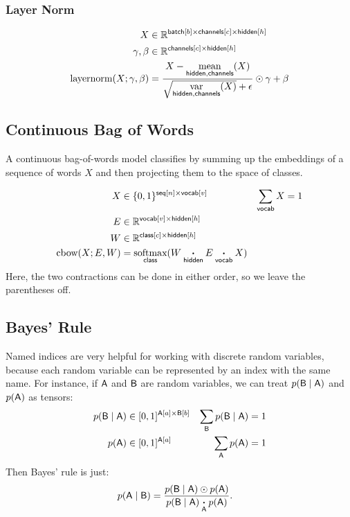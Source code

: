 \documentclass{article}
\newcommand{\reals}{\mathbb{R}}
\begin{document}
\subsubsection*{Layer Norm}

\begin{align*} 
X &\in \reals^{{\nset{batch}{b} \times \nset{channels}{c} \times \nset{hidden}{h}}} \\
\gamma, \beta &\in \reals^{{\nset{channels}{c} \times \nset{hidden}{h}}} \\
\text{layernorm}(X; \gamma, \beta) &= \frac{X - \nfun{hidden,channels}{\text{mean}}(X)}{\sqrt{\nfun{hidden, channels}{\text{var}}(X)} + \epsilon} \odot \gamma + \beta 
\end{align*}


\subsection{Continuous Bag of Words}

A continuous bag-of-words model classifies by summing up the embeddings of a sequence of words $X$ and then projecting them to the space of classes. 

\begin{align*} 
X &\in \{0, 1\}^{{\nset{seq}{n} \times \nset{vocab}{v}}} & \nsum{vocab} X &= 1\\
E &\in \reals^{{\nset{vocab}{v} \times \nset{hidden}{h}}}\\
W &\in \reals^{{\nset{class}{c} \times \nset{hidden}{h}}}\\
\text{cbow}(X; E, W) &= \nfun{class}{softmax} (W \ndot{hidden} E \ndot{vocab} X)
\end{align*}
Here, the two contractions can be done in either order, so we leave the parentheses off.

\subsection{Bayes' Rule}

Named indices are very helpful for working with discrete random variables, because each random variable can be represented by an index with the same name. For instance, if $\mathsf{A}$ and $\mathsf{B}$ are random variables, we can treat $p(\mathsf{B} \mid \mathsf{A})$ and $p(\mathsf{A})$ as tensors:
\begin{align*} 
p(\mathsf{B} \mid \mathsf{A}) &\in [0, 1]^{\mathsf{A}[a] \times \mathsf{B}[b]} & \sum\limits_{\mathsf{B}} p(\mathsf{B}\mid \mathsf{A}) &= 1 \\
p(\mathsf{A}) &\in [0, 1]^{\mathsf{A}[a]} & \sum\limits_{\mathsf{A}} p(\mathsf{A}) &= 1
\end{align*}
Then Bayes' rule is just:
\begin{align*}
p(\mathsf{A} \mid \mathsf{B}) &= \frac{p(\mathsf{B} \mid \mathsf{A}) \odot p(\mathsf{A})}{p(\mathsf{B} \mid \mathsf{A}) \mathbin{\mathop{\boldsymbol\cdot}\limits_{\mathsf{A}}} p(\mathsf{A})}.
\end{align*}
\end{document}
